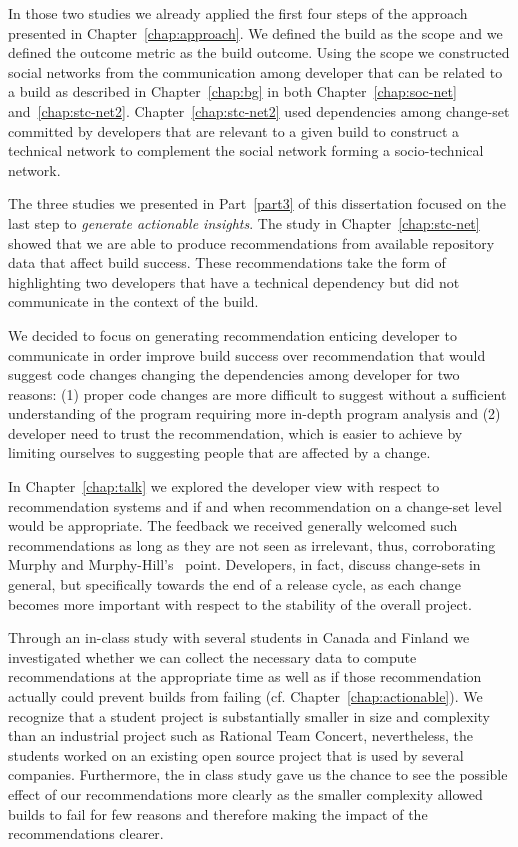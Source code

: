 In those two studies we already applied the first four steps of the approach presented in Chapter~\ref{chap:approach}.
We defined the build as the scope and we defined the outcome metric as the build outcome.
Using the scope we constructed social networks from the communication among developer that can be related to a build as described in Chapter~\ref{chap:bg} in both Chapter~\ref{chap:soc-net} and~\ref{chap:stc-net2}.
Chapter~\ref{chap:stc-net2} used dependencies among change-set committed by developers that are relevant to a given build to construct a technical network to complement the social network forming a socio-technical network.

The three studies we presented in Part~\ref{part3} of this dissertation focused on the last step to \emph{generate actionable insights}.
The study in Chapter~\ref{chap:stc-net} showed that we are able to produce recommendations from available repository data that affect build success.
These recommendations take the form of highlighting two developers that have a technical dependency but did not communicate in the context of the build.

We decided to focus on generating recommendation enticing developer to communicate in order improve build success over recommendation that would suggest code changes changing the dependencies among developer for two reasons:
(1) proper code changes are more difficult to suggest without a sufficient understanding of the program requiring more in-depth program analysis and 
(2) developer need to trust the recommendation, which is easier to achieve by limiting ourselves to suggesting people that are affected by a change.

In Chapter~\ref{chap:talk} we explored the developer view with respect to recommendation systems and if and when recommendation on a change-set level would be appropriate.
The feedback we received generally welcomed such recommendations as long as they are not seen as irrelevant, thus, corroborating Murphy and Murphy-Hill's~\cite{murphy:rsse:2010} point.
Developers, in fact, discuss change-sets in general, but specifically towards the end of a release cycle, as each change becomes more important with respect to the stability of the overall project.

Through an in-class study with several students in Canada and Finland we investigated whether we can collect the necessary data to compute recommendations at the appropriate time as well as if those recommendation actually could prevent builds from failing (cf. Chapter~\ref{chap:actionable}).
We recognize that a student project is substantially smaller in size and complexity than an industrial project such as Rational Team Concert, nevertheless, the students worked on an existing open source project that is used by several companies.
Furthermore, the in class study gave us the chance to see the possible effect of our recommendations more clearly as the smaller complexity allowed builds to fail for few reasons and therefore making the impact of the recommendations clearer.

